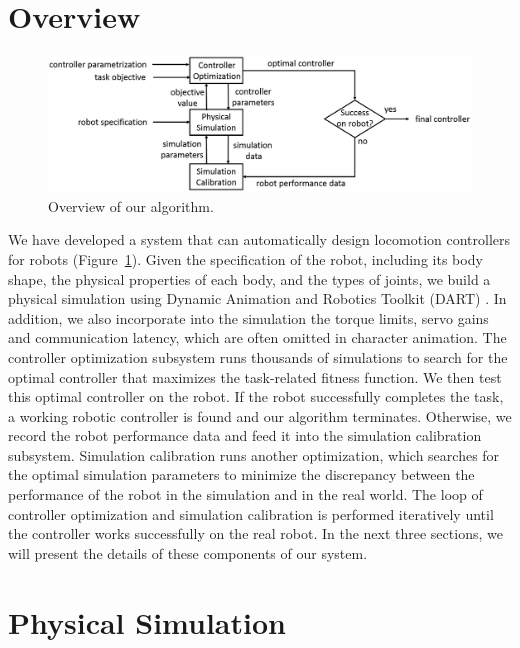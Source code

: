 \section{Overview}

\begin{figure}[!t]
  \centering
  \includegraphics[width=6in]{figures/controllerTransfer}
  \caption{Overview of our algorithm.}
  \label{fig:controllerTransferOverview}
\end{figure}

We have developed a system that can automatically design locomotion controllers for robots (Figure~\ref{fig:controllerTransferOverview}). Given the specification of the robot, including its body shape, the physical properties of each body, and the types of joints, we build a physical simulation using Dynamic Animation and Robotics Toolkit (DART) \cite{dart:2012}. In addition, we also incorporate into the simulation the torque limits, servo gains and communication latency, which are often omitted in character animation. The controller optimization subsystem runs thousands of simulations to search for the optimal controller that maximizes the task-related fitness function. We then test this optimal controller on the robot. If the robot successfully completes the task, a working robotic controller is found and our algorithm terminates. Otherwise, we record the robot performance data and feed it into the simulation calibration subsystem. Simulation calibration runs another optimization, which searches for the optimal simulation parameters to minimize the discrepancy between the performance of the robot in the simulation and in the real world. The loop of controller optimization and simulation calibration is performed iteratively until the controller works successfully on the real robot. In the next three sections, we will present the details of these components of our system.

\section{Physical Simulation}

